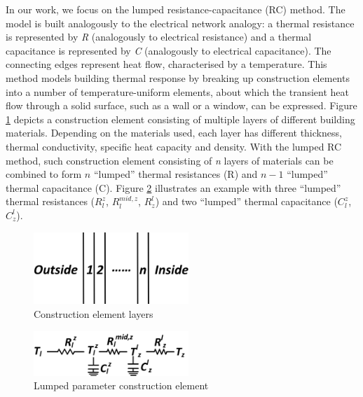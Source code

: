 
In our work, we focus on the lumped resistance-capacitance (RC) method.
The model is built analogously to the electrical network analogy: a thermal resistance is represented by \textsl{R} (analogously to electrical resistance) and a thermal capacitance is represented by \textsl{C} (analogously to electrical capacitance). The connecting edges represent heat flow, characterised by a temperature.
This method models building thermal response by breaking up construction elements into a number of temperature-uniform elements, about which the transient heat flow through a solid surface, such as a wall or a window, can be expressed. 
Figure \ref{fig:background:walls} depicts a construction element consisting of multiple layers of different building materials. Depending on the materials used, each layer has different thickness, thermal conductivity, specific heat capacity and density. With the lumped RC method, such construction element consisting of \textsl{n} layers of materials can be combined to form $n$ ``lumped'' thermal resistances (R) and $n-1$ ``lumped'' thermal capacitance (C). Figure \ref{fig:background:rc} illustrates an example with three ``lumped'' thermal resistances ($R^z_l$, $R^{mid,z}_l$, $R^l_z$) and two ``lumped'' thermal capacitance ($C^z_l$, $C^l_z$).

\begin{figure}[h]
\centering
\includegraphics[width=2.3in,keepaspectratio]{./figs/background_walls.jpg}
\caption{Construction element layers}
\label{fig:background:walls}
\end{figure}

\begin{figure}[h]
\centering
\includegraphics[width=2.3in,keepaspectratio]{./figs/background_rc.jpg}
\caption{Lumped parameter construction element}
\label{fig:background:rc}
\end{figure}

